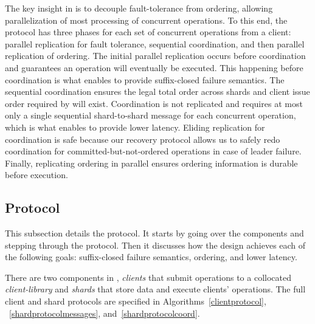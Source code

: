The key insight in \sys{} is to decouple fault-tolerance from ordering, allowing
parallelization of most processing of concurrent operations. To this end, the
\sys{} protocol has three phases for each set of concurrent operations from a
client: parallel replication for fault tolerance, sequential coordination, and
then parallel replication of ordering.  The initial parallel replication occurs
before coordination and guarantees an operation will eventually be executed.
This happening before coordination is what enables \sys{} to provide
suffix-closed failure semantics.  The sequential coordination ensures the legal
total order across shards and client issue order required by \mdl{} will exist.
Coordination is not replicated and requires at most only a single sequential
shard-to-shard message for each concurrent operation, which is what enables
\sys{} to provide lower latency.  Eliding replication for coordination is safe
because our recovery protocol allows us to safely redo coordination for
committed-but-not-ordered operations in case of leader failure.  Finally,
replicating ordering in parallel ensures ordering information is durable before
execution.




\subsection{Protocol}
This subsection details the \sys{} protocol.
It starts by going over the components and stepping through the protocol.
Then it discusses how the design achieves each of the following goals:
suffix-closed failure semantics,
\mdl{} ordering,
and lower latency.

There are two components in \sys{}, \textit{clients} that submit operations to a collocated \textit{client-library} and \textit{shards} that store data and execute clients' operations.
The full client and shard protocols are specified in Algorithms~\ref{clientprotocol}, ~\ref{shardprotocolmessages}, and~\ref{shardprotocolcoord}.

